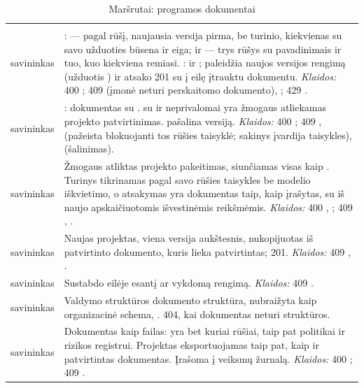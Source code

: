 \begin{xltabular}{\textwidth}{@{}L{19mm}Y@{}}
\caption{Maršrutai: programos dokumentai}\label{tab:api:programme}\\
\toprule {} &  \\ \midrule \endfirsthead
\toprule {} &  \\ \midrule \endhead
\bottomrule \endlastfoot
{}
savininkas & :  --- pagal rūšį, naujausia versija pirma, be turinio,
  kiekvienas su savo užduoties būsena ir eiga; ir  --- trys rūšys su pavadinimais ir
  tuo, kuo kiekviena remiasi. :  ir ; paleidžia naujos
  versijos rengimą (užduotis ) ir atsako 201 su į eilę įtrauktu
  dokumentu. \emph{Klaidos:} 400 ; 409  (įmonė neturi
  perskaitomo dokumento), ; 429 . \\
\addlinespace
{}
savininkas & : dokumentas su .  su  ir
  neprivalomai  yra žmogaus atliekamas projekto patvirtinimas.  pašalina
  versiją. \emph{Klaidos:} 400 ; 409 , 
  (pažeista blokuojanti tos rūšies taisyklė; sakinys įvardija taisykles), 
  (šalinimas). \\
\addlinespace
{}
savininkas & Žmogaus atliktas projekto pakeitimas, siunčiamas visas kaip . Turinys
  tikrinamas pagal savo rūšies taisykles be modelio iškvietimo, o atsakymas yra dokumentas taip,
  kaip įrašytas, su iš naujo apskaičiuotomis išvestinėmis reikšmėmis. \emph{Klaidos:} 400
  , ; 409 , . \\
\addlinespace
{}
savininkas & Naujas projektas, viena versija aukštesnis, nukopijuotas iš patvirtinto dokumento,
  kuris lieka patvirtintas; 201. \emph{Klaidos:} 409 , . \\
\addlinespace
{}
savininkas & Sustabdo eilėje esantį ar vykdomą rengimą. \emph{Klaidos:} 409
  . \\
\addlinespace
{}
savininkas & Valdymo struktūros dokumento struktūra, nubraižyta kaip organizacinė schema,
  . 404, kai dokumentas neturi struktūros. \\
\addlinespace
{}
savininkas & Dokumentas kaip failas:  yra  bet kuriai rūšiai, taip pat
   politikai ir  rizikos registrui. Projektas eksportuojamas taip pat, kaip
  ir patvirtintas dokumentas. Įrašoma į veiksmų žurnalą. \emph{Klaidos:} 400
  ; 409 . \\
\end{xltabular}

